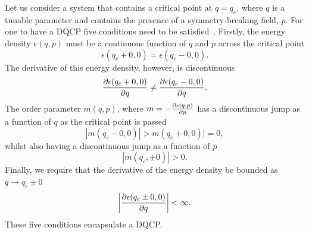 Let us consider a system that contains a critical point at
\( q = q_c \), where \( q \) is a tunable parameter and contains
the presence of a symmetry-breaking field, \( p \).
For one to have a DQCP five conditions need to be satisfied~\cite{Suzuki2015}.
Firstly, the energy density \( \epsilon(q, p) \) must be a continuous
function of \( q \) and \( p \) across the critical point
\begin{equation}
    \epsilon(q_c + 0, 0) = \epsilon(q_c - 0, 0).
    \label{eq: continuous-energy-cond}
\end{equation}
The derivative of this energy density, however, is discontinuous
\begin{equation}
    \pdv{\epsilon(q_c + 0, 0)}{q} \neq \pdv{\epsilon(q_c - 0, 0)}{q}.
\end{equation}
The order parameter \( m(q, p) \), where \( m=-\pdv{\epsilon(q, p)}{p} \)
has a discontinuous jump as a function of \( q \) as the critical point is
passed
\begin{equation}
    |m(q_c - 0, 0)| > m(q_c + 0, 0)| = 0,
\end{equation}
whilst also having a discontinuous jump as a function of \( p \)
\begin{equation}
    |m(q_c, \pm 0)| > 0.
\end{equation}
Finally, we require that the derivative of the energy density be bounded as
\( q \rightarrow q_c \pm 0 \)
\begin{equation}
    \left|\pdv{\epsilon(q_c \pm 0, 0)}{q}\right| < \infty.
    \label{eq: bounded-energy-derivative-cond}
\end{equation}
These five conditions encapsulate a DQCP\@.

